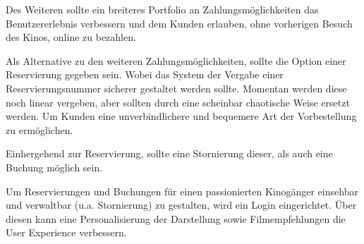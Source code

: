 Des Weiteren sollte ein breiteres Portfolio an Zahlungsmöglichkeiten das Benutzererlebnis verbessern und dem Kunden erlauben, ohne vorherigen Besuch des Kinos, online zu bezahlen.

Als Alternative zu den weiteren Zahlungsmöglichkeiten, sollte die Option einer Reservierung gegeben sein.
Wobei das System der Vergabe einer Reservierungsnummer sicherer gestaltet werden sollte.
Momentan werden diese noch linear vergeben, aber sollten durch eine scheinbar chaotische Weise ersetzt werden.
Um Kunden eine unverbindlichere und bequemere Art der Vorbestellung zu ermöglichen.

Einhergehend zur Reservierung, sollte eine Stornierung dieser, als auch eine Buchung möglich sein.

Um Reservierungen und Buchungen für einen passionierten Kinogänger einsehbar und verwaltbar (u.a. Stornierung) zu gestalten, wird ein Login eingerichtet. 
Über diesen kann eine Personalisierung der Darstellung sowie Filmempfehlungen die User Experience verbessern.


